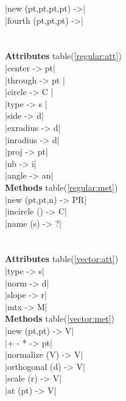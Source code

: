 \documentclass[DIV         = 14,
               fontsize    = 10,
               index       = totoc,
               twoside,
               cadre,
               headings    = small
               ]{tkz-doc}
\begin{document}
\begin{multicols}{3}
|new (pt,pt,pt,pt)         ->|     \\ 
|fourth (pt,pt,pt)         ->|     \\
                                   \\
   \\
 \textbf{Attributes} table(\ref{regular:att}) \\
|center                    -> pt|  \\
|through                   -> pt | \\
|circle                    -> C |  \\
|type                      -> s |  \\
|side                      -> d|   \\
|exradius                  -> d|   \\
|inradius                  -> d|   \\
|proj                      -> pt|  \\
|nb                        -> i|   \\
|angle                     -> an|  \\
 \textbf{Methods} table(\ref{regular:met})  \\
|new (pt,pt,n)             -> PR|  \\
|incircle ()               -> C|   \\
|name (s)                  -> ?|   \\
                                   \\
             \\
\textbf{Attributes} table(\ref{vector:att}) \\
|type                      -> s|   \\
|norm                      -> d|   \\
|slope                     -> r|   \\
|mtx                       -> M|   \\
\textbf{Methods} table(\ref{vector:met})  \\
|new (pt,pt)               -> V|   \\
|+ - *                     -> pt|  \\
|normalize (V)             -> V|   \\
|orthogonal (d)            -> V|   \\
|scale (r)                 -> V|   \\
|at (pt)                   -> V|   \\

\end{multicols}
\end{document}
